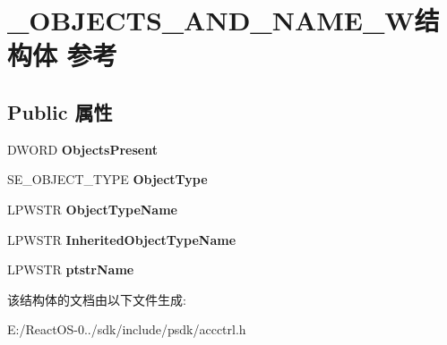 \hypertarget{struct___o_b_j_e_c_t_s___a_n_d___n_a_m_e___w}{}\section{\+\_\+\+O\+B\+J\+E\+C\+T\+S\+\_\+\+A\+N\+D\+\_\+\+N\+A\+M\+E\+\_\+\+W结构体 参考}
\label{struct___o_b_j_e_c_t_s___a_n_d___n_a_m_e___w}
\subsection*{Public 属性}
\begin{DoxyCompactItemize}
\item 
\mbox{\label{struct___o_b_j_e_c_t_s___a_n_d___n_a_m_e___w_a6f2b1ec55736809a988a9c0b851a638d}} 
D\+W\+O\+RD {\bfseries Objects\+Present}
\item 
\mbox{\label{struct___o_b_j_e_c_t_s___a_n_d___n_a_m_e___w_af071a8b321eeec1f5aa02ad5bf407f00}} 
S\+E\+\_\+\+O\+B\+J\+E\+C\+T\+\_\+\+T\+Y\+PE {\bfseries Object\+Type}
\item 
\mbox{\label{struct___o_b_j_e_c_t_s___a_n_d___n_a_m_e___w_a57ed82a3aacf6a4c1050ba285ad83d12}} 
L\+P\+W\+S\+TR {\bfseries Object\+Type\+Name}
\item 
\mbox{\label{struct___o_b_j_e_c_t_s___a_n_d___n_a_m_e___w_a11461cc68a471d0e8bbc102fcbb4ea3b}} 
L\+P\+W\+S\+TR {\bfseries Inherited\+Object\+Type\+Name}
\item 
\mbox{\label{struct___o_b_j_e_c_t_s___a_n_d___n_a_m_e___w_a0dd2008183a30c95beb854cdff4b34a6}} 
L\+P\+W\+S\+TR {\bfseries ptstr\+Name}
\end{DoxyCompactItemize}


该结构体的文档由以下文件生成\+:\begin{DoxyCompactItemize}
\item 
E\+:/\+React\+O\+S-\/0../sdk/include/psdk/accctrl.\+h\end{DoxyCompactItemize}
